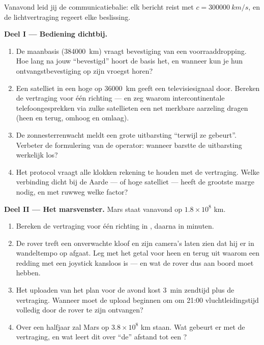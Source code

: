 \begin{problem}\label{pb:g8:speed-of-light:1}
Vanavond leid jij de communicatiebalie: elk bericht reist met $c =
\qty{300000}{km/s}$, en de lichtvertraging regeert elke beslissing.

\medskip\noindent\textbf{Deel I --- Bediening dichtbij.}
\begin{enumerate}
  \item De maanbasis (\qty{384000}{km}) vraagt bevestiging van een
        voorraaddropping. Hoe lang na jouw ``bevestigd'' hoort de
        basis het, en wanneer kun je hun ontvangstbevestiging op zijn
        vroegst horen?
  \item Een satelliet in een hoge  op \qty{36000}{km}
        geeft een televisiesignaal door. Bereken de vertraging voor
        één richting --- en zeg waarom intercontinentale
        telefoongesprekken via zulke satellieten een net merkbare
        aarzeling dragen (heen en terug, omhoog en omlaag).
  \item De zonnesterrenwacht meldt een grote uitbarsting ``terwijl ze
        gebeurt''. Verbeter de formulering van de operator: wanneer
        barstte de uitbarsting werkelijk los?
  \item Het protocol vraagt alle klokken rekening te houden met de
        vertraging. Welke verbinding dicht bij de Aarde ---
         of hoge satelliet --- heeft de grootste marge
        nodig, en met ruwweg welke factor?
\end{enumerate}

\medskip\noindent\textbf{Deel II --- Het marsvenster.}
Mars staat vanavond op $1.8 \times 10^{8}$ km.
\begin{enumerate}[resume]
  \item Bereken de vertraging voor één richting in , daarna in
        minuten.
  \item De rover treft een onverwachte kloof en zijn camera's laten
        zien dat hij er in wandeltempo op afgaat. Leg met het getal
        voor heen en terug uit waarom een redding met een joystick
        kansloos is --- en wat de rover dus aan boord moet hebben.
  \item Het uploaden van het plan voor de avond kost \qty{3}{min}
        zendtijd plus de vertraging. Wanneer moet de upload beginnen
        om om 21:00 vluchtleidingstijd volledig door de rover te zijn
        ontvangen?
  \item Over een halfjaar zal Mars op $3.8 \times 10^{8}$ km staan.
        Wat gebeurt er met de vertraging, en wat leert dit over
        ``de'' afstand tot een ?
\end{enumerate}


\end{problem}
